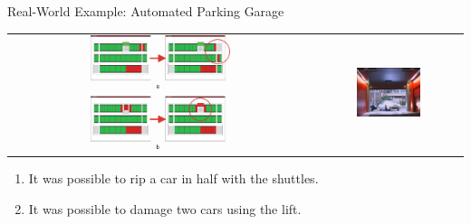 \documentclass[aspectratio=1610]{beamer}
\begin{document}
  \begin{frame}{Real-World Example: Automated Parking Garage}
    \begin{tabular}{cc}
      \includegraphics[width=0.475\textwidth, valign=t]{parking_garage_errors.png}
      &
      \includegraphics[width=0.465\textwidth, valign=t]{parking_garage_enter.png}
    \end{tabular}

    \begin{enumerate}[label=(\alph*)]
      \item It was possible to rip a car in half with the shuttles.
      \item It was possible to damage two cars using the lift.
    \end{enumerate}
  \end{frame}
\end{document}
